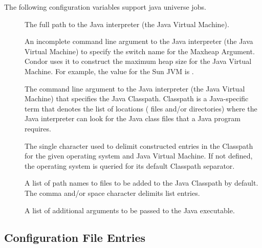 The following configuration variables support java universe jobs.

\begin{description}
\item[]
\label{param:Java}
  The full path to the Java interpreter (the Java Virtual Machine).

\item[]
\label{param:JavaMaxheapArgument}
  An incomplete command line argument to the Java interpreter
  (the Java Virtual Machine)
  to specify the switch name for the Maxheap Argument.
  Condor uses it to construct the maximum heap size
  for the Java Virtual Machine. 
  For example, the value for the Sun JVM is .

\item[]
\label{param:JavaClasspathArgument}
  The command line argument to the Java interpreter (the Java Virtual Machine)
  that specifies the Java Classpath.
  Classpath is a Java-specific term that denotes the list of
  locations ( files and/or directories)
  where the Java interpreter can
  look for the Java class files that a Java program requires.

\item[]
\label{param:JavaClasspathSeparator}
  The single character used to delimit constructed entries in the
  Classpath for the given operating system and Java Virtual Machine.
  If not defined, the operating system is queried for its default
  Classpath separator.

\item[]
\label{param:JavaClasspathDefault}
  A list of path names to  files to be added to the Java Classpath 
  by default.
  The comma and/or space character delimits list entries.

\item[]
\label{param:JavaExtraArguments}
  A list of additional arguments to be passed to the Java executable.
\end{description}

\subsection{\label{sec:Schedd-Config-File-Entries}
Configuration File Entries}

